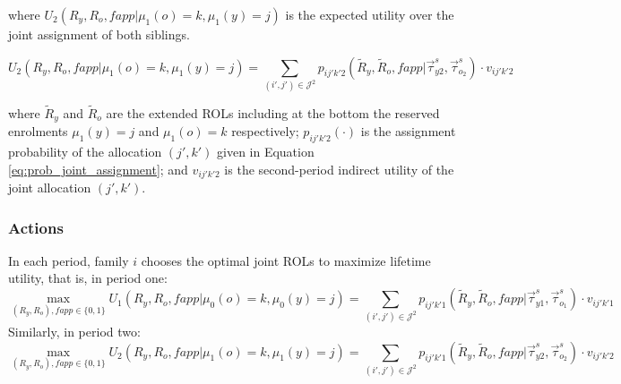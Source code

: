 \documentclass{article}
\begin{document}
where $U_2\left( R_y, R_o, fapp | \mu_1(o) = k, \mu_1(y) = j \right)$ is the expected utility over the joint assignment of both siblings.  

\begin{equation}
    U_2\left( R_y, R_o, fapp | \mu_1(o) = k, \mu_1(y) = j \right) = \sum_{(i',j')\in \mathcal{J}^2}  p_{ij'k'2}\left( \tilde{R}_{y}, \tilde{R}_{o}, fapp| \vec{\tau}^{s}_{y2}, \vec{\tau}^{s}_{o_2} \right) \cdot v_{ij'k'2}
\end{equation}

where $\tilde{R}_{y}$ and $\tilde{R}_{o}$ are the extended ROLs including at the bottom the reserved enrolments $\mu_1(y) = j$ and $\mu_1(o) = k$ respectively;  $p_{ij'k'2}\left( \cdot \right)$ is the assignment probability of the allocation $(j',k')$ given in Equation \ref{eq:prob_joint_assignment}; and $v_{ij'k'2}$ is the second-period indirect utility of the joint allocation $(j',k')$.  

\subsubsection{Actions}

In each period, family $i$ chooses the optimal joint ROLs to maximize lifetime utility, that is, in period one:
\begin{equation}
    \max_{\left( R_y, R_o\right), fapp \in \lbrace 0, 1 \rbrace} U_1\left( R_y, R_o, fapp | \mu_0(o) = k, \mu_0(y) = j \right) = \sum_{(i',j')\in \mathcal{J}^2}  p_{ij'k'1}\left( \tilde{R}_{y}, \tilde{R}_{o}, fapp| \vec{\tau}^{s}_{y1}, \vec{\tau}^{s}_{o_1} \right) \cdot v_{ij'k'1}
\end{equation}
Similarly, in period two:
\begin{equation}
    \max_{\left( R_y, R_o\right), fapp \in \lbrace 0, 1 \rbrace} U_2\left( R_y, R_o, fapp | \mu_1(o) = k, \mu_1(y) = j \right) = \sum_{(i',j')\in \mathcal{J}^2}  p_{ij'k'1}\left( \tilde{R}_{y}, \tilde{R}_{o}, fapp| \vec{\tau}^{s}_{y2}, \vec{\tau}^{s}_{o_2} \right) \cdot v_{ij'k'2}
\end{equation}
\end{document}
